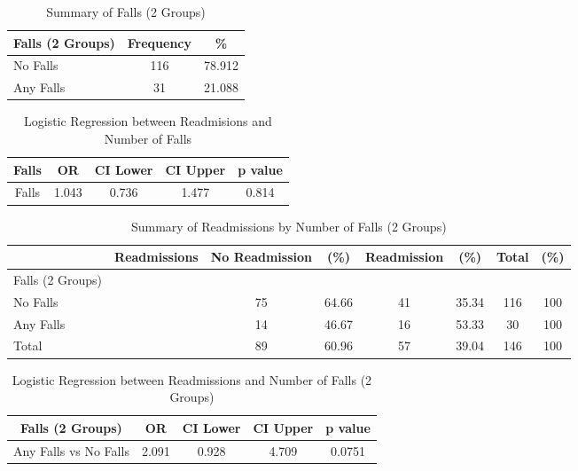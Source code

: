 \documentclass[12pt,]{article}
\begin{document}
\begin{table}[!h]

\caption{\label{tab:unnamed-chunk-19}Summary of Falls (2 Groups)}
\centering
\begin{tabular}{>{\centering\arraybackslash}p{5cm}cc}
\toprule
Falls (2 Groups) & Frequency & \%\\
\midrule
No Falls & 116 & 78.912\\
\rowcolor[HTML]{E3E5E7}  Any Falls & 31 & 21.088\\
\bottomrule
\end{tabular}
\end{table}

\pagebreak

\begin{table}[!h]

\caption{\label{tab:unnamed-chunk-20}Logistic Regression between Readmisions and Number of Falls}
\centering
\begin{tabular}{ccccc}
\toprule
Falls & OR & CI Lower & CI Upper & p value\\
\midrule
\rowcolor{white}  Falls & 1.043 & 0.736 & 1.477 & 0.814\\
\bottomrule
\end{tabular}
\end{table}

\begin{table}[!h]

\caption{\label{tab:unnamed-chunk-20}Summary of Readmissions by Number of Falls (2 Groups)}
\centering
\begin{tabular}{>{\centering\arraybackslash}p{5cm}ccccccc}
\toprule
  & Readmissions & No Readmission & (\%) & Readmission & (\%) & Total & (\%)\\
\midrule
Falls (2 Groups) &  &  &  &  &  &  & \\
\rowcolor[HTML]{E3E5E7}  No Falls &  & 75 & 64.66 & 41 & 35.34 & 116 & 100\\
Any Falls &  & 14 & 46.67 & 16 & 53.33 & 30 & 100\\
\rowcolor[HTML]{E3E5E7}  Total &  & 89 & 60.96 & 57 & 39.04 & 146 & 100\\
\bottomrule
\end{tabular}
\end{table}

\begin{table}[!h]

\caption{\label{tab:unnamed-chunk-20}Logistic Regression between Readmissions and Number of Falls (2 Groups)}
\centering
\begin{tabular}{ccccc}
\toprule
Falls (2 Groups) & OR & CI Lower & CI Upper & p value\\
\midrule
\rowcolor{white}  Any Falls vs No Falls & 2.091 & 0.928 & 4.709 & 0.0751\\
\bottomrule
\end{tabular}
\end{table}
\end{document}
